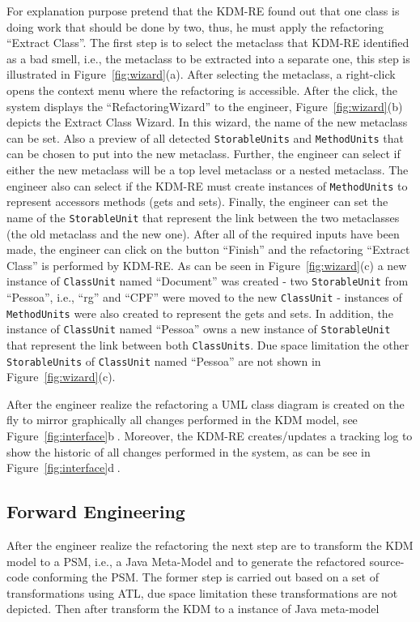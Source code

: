 For explanation purpose pretend that the KDM-RE found out that one class is doing work that should be done by two, thus, he must apply the refactoring ``Extract Class''. The first step is to select the metaclass that KDM-RE identified as a bad smell, i.e., the metaclass to be extracted into a separate one, this step is illustrated in Figure~\ref{fig:wizard}(a). After selecting the metaclass, a right-click opens the context menu where the refactoring is accessible. After the click, the system displays the ``RefactoringWizard'' to the engineer, Figure~\ref{fig:wizard}(b) depicts the Extract Class Wizard. In this wizard, the name of the new metaclass can be set. Also a preview of all detected \texttt{StorableUnits} and \texttt{MethodUnits} that can be chosen to put into the new metaclass. Further, the engineer can select if either the new metaclass will be a top level metaclass or a nested metaclass. The engineer also can select if the KDM-RE must create instances of \texttt{MethodUnits} to represent accessors methods (gets and sets). Finally, the engineer can set the name of the \texttt{StorableUnit} that represent the link between the two metaclasses (the old metaclass and the new one). After all of the required inputs have been made, the engineer can click on the button ``Finish'' and the refactoring ``Extract Class'' is performed by KDM-RE. As can be seen in Figure~\ref{fig:wizard}(c) a new instance of \texttt{ClassUnit} named ``Document'' was created - two \texttt{StorableUnit} from ``Pessoa'', i.e., ``rg'' and ``CPF'' were moved to the new \texttt{ClassUnit} - instances of \texttt{MethodUnits} were also created to represent the gets and sets. In addition, the instance of \texttt{ClassUnit} named ``Pessoa'' owns a new instance of \texttt{StorableUnit} that represent the link between both \texttt{ClassUnits}. Due space limitation the other \texttt{StorableUnits} of \texttt{ClassUnit} named ``Pessoa'' are not shown in Figure~\ref{fig:wizard}(c).

After the engineer realize the refactoring a UML class diagram is created on the fly to mirror graphically all changes performed in the KDM model, see Figure~\ref{fig:interface}\textcircled{b}. Moreover, the KDM-RE creates/updates a tracking log to show the historic of all changes performed in the system, as can be see in Figure~\ref{fig:interface}\textcircled{d}. 

\subsection{Forward Engineering}
After the engineer realize the refactoring the next step are to transform the KDM model to a PSM, i.e., a Java Meta-Model and to generate the refactored source-code conforming the PSM. The former step is carried out based on a set of transformations using ATL, due space limitation these transformations are not depicted. Then after transform the KDM to a instance of Java meta-model 

